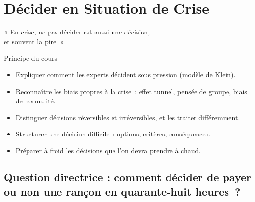 
\chapter{Décider en Situation de Crise}
\label{chap:decider}

\epigraph{%
    « En crise, ne pas décider est aussi une décision,\\
    et souvent la pire. »%
}{Principe du cours}


\begin{boxobjectifs}
\begin{itemize}
    \item Expliquer comment les experts décident sous pression (modèle de
          Klein).
    \item Reconnaître les biais propres à la crise~: effet tunnel, pensée de
          groupe, biais de normalité.
    \item Distinguer décisions réversibles et irréversibles, et les traiter
          différemment.
    \item Structurer une décision difficile~: options, critères, conséquences.
    \item Préparer à froid les décisions que l'on devra prendre à chaud.
\end{itemize}
\end{boxobjectifs}

\bigskip

\section*{Question directrice : comment décider de payer ou non une rançon en quarante-huit heures~?}

